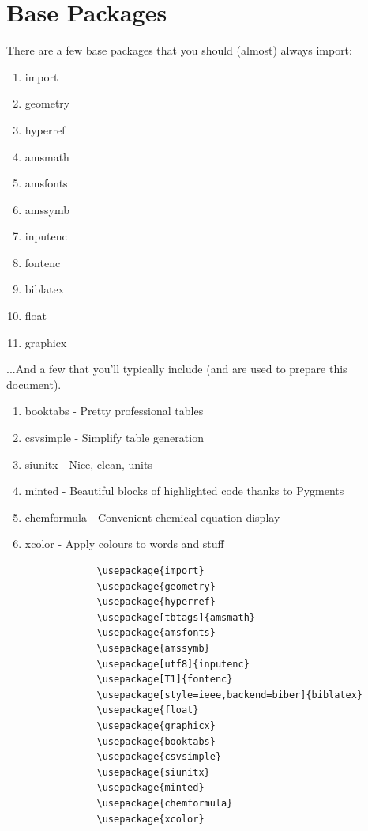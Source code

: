 \documentclass[hidelinks, 12pt]{article}%
\begin{document}
    \section{Base Packages}
        There are a few base packages that you should (almost) always import:
        \begin{enumerate}
            \item import
            \item geometry
            \item hyperref
            \item amsmath
            \item amsfonts
            \item amssymb
            \item inputenc
            \item fontenc
            \item biblatex
            \item float
            \item graphicx
        \end{enumerate}
        ...And a few that you'll typically include (and are used to prepare this document).
        \begin{enumerate}
            \item booktabs - Pretty professional tables
            \item csvsimple - Simplify table generation
            \item siunitx - Nice, clean, units
            \item minted - Beautiful blocks of highlighted code thanks to Pygments
            \item chemformula - Convenient chemical equation display
            \item xcolor - Apply colours to words and stuff
        \end{enumerate}

        \begin{listing}[H]
            \centering
            \begin{verbatim}
                \usepackage{import}
                \usepackage{geometry}
                \usepackage{hyperref}
                \usepackage[tbtags]{amsmath}
                \usepackage{amsfonts}
                \usepackage{amssymb}
                \usepackage[utf8]{inputenc}
                \usepackage[T1]{fontenc}
                \usepackage[style=ieee,backend=biber]{biblatex}
                \usepackage{float}
                \usepackage{graphicx}
                \usepackage{booktabs}
                \usepackage{csvsimple}
                \usepackage{siunitx}
                \usepackage{minted}
                \usepackage{chemformula}
                \usepackage{xcolor}
            \end{verbatim}
            \caption{Code to include packages in a \LaTeX document (as used in this document)}
            \label{lst:packages}
        \end{listing}
\end{document}
